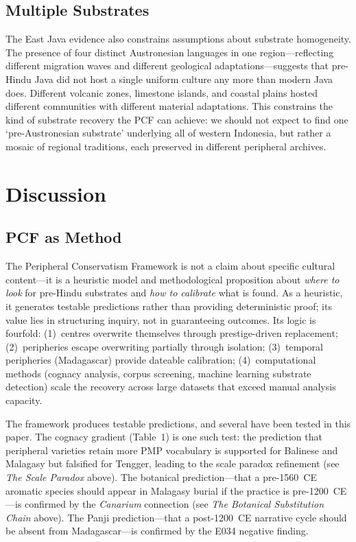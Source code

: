 \documentclass[12pt,a4paper]{article}
\begin{document}
\subsection{Multiple Substrates}

The East Java evidence also constrains assumptions about substrate homogeneity. The presence of four distinct Austronesian languages in one region---reflecting different migration waves and different geological adaptations---suggests that pre-Hindu Java did not host a single uniform culture any more than modern Java does. Different volcanic zones, limestone islands, and coastal plains hosted different communities with different material adaptations. This constrains the kind of substrate recovery the PCF can achieve: we should not expect to find one `pre-Austronesian substrate' underlying all of western Indonesia, but rather a mosaic of regional traditions, each preserved in different peripheral archives.

\section{Discussion}

\subsection{PCF as Method}

The Peripheral Conservatism Framework is not a claim about specific cultural content---it is a heuristic model and methodological proposition about \emph{where to look} for pre-Hindu substrates and \emph{how to calibrate} what is found. As a heuristic, it generates testable predictions rather than providing deterministic proof; its value lies in structuring inquiry, not in guaranteeing outcomes. Its logic is fourfold: (1)~centres overwrite themselves through prestige-driven replacement; (2)~peripheries escape overwriting partially through isolation; (3)~temporal peripheries (Madagascar) provide dateable calibration; (4)~computational methods (cognacy analysis, corpus screening, machine learning substrate detection) scale the recovery across large datasets that exceed manual analysis capacity.

The framework produces testable predictions, and several have been tested in this paper. The cognacy gradient (Table~1) is one such test: the prediction that peripheral varieties retain more PMP vocabulary is supported for Balinese and Malagasy but falsified for Tengger, leading to the scale paradox refinement (see \emph{The Scale Paradox} above). The botanical prediction---that a pre-1560~CE aromatic species should appear in Malagasy burial if the practice is pre-1200~CE---is confirmed by the \emph{Canarium} connection (see \emph{The Botanical Substitution Chain} above). The Panji prediction---that a post-1200~CE narrative cycle should be absent from Madagascar---is confirmed by the E034 negative finding.
\end{document}
